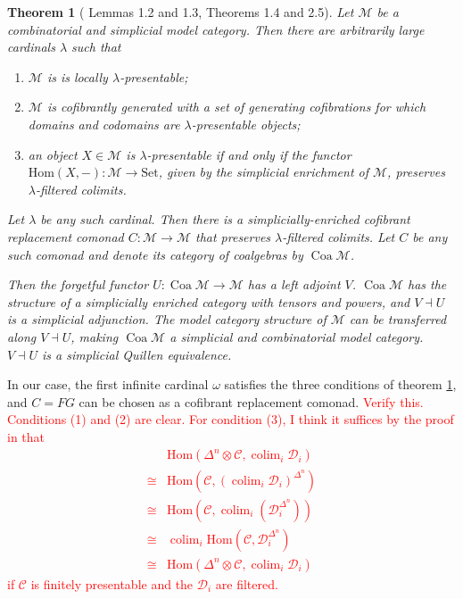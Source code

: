 \documentclass{article}
\newcommand{\todo}[1]{\textcolor{red}{#1}}
\newtheorem{theorem}{Theorem}
\begin{document}
\begin{theorem}[\cite{coalgebraic-models} Lemmas 1.2 and 1.3, Theorems 1.4 and 2.5]
  \label{th:coalgebraic-model-category}
  Let $\mathcal{M}$ be a combinatorial and simplicial model category.
  Then there are arbitrarily large cardinals $\lambda$ such that
  \begin{enumerate}
    \item
      $\mathcal{M}$ is is locally $\lambda$-presentable;
    \item
      $\mathcal{M}$ is cofibrantly generated with a set of generating cofibrations for which domains and codomains are $\lambda$-presentable objects;
    \item
      an object $X \in \mathcal{M}$ is $\lambda$-presentable if and only if the functor $\mathrm{Hom}(X, -) : \mathcal{M} \rightarrow \mathrm{Set}$, given by the simplicial enrichment of $\mathcal{M}$, preserves $\lambda$-filtered colimits.
  \end{enumerate}

  Let $\lambda$ be any such cardinal.
  Then there is a simplicially-enriched cofibrant replacement comonad $C : \mathcal{M} \rightarrow \mathcal{M}$ that preserves $\lambda$-filtered colimits. 
  Let $C$ be any such comonad and denote its category of coalgebras by $\operatorname{Coa} \mathcal{M}$.

  Then the forgetful functor $U : \operatorname{Coa} \mathcal{M} \rightarrow \mathcal{M}$ has a left adjoint $V$.
  $\operatorname{Coa} \mathcal{M}$ has the structure of a simplicially enriched category with tensors and powers, and $V \dashv U$ is a simplicial adjunction.
  The model category structure of $\mathcal{M}$ can be transferred along $V \dashv U$, making $\operatorname{Coa} \mathcal{M}$ a simplicial and combinatorial model category.
  $V \dashv U$ is a simplicial Quillen equivalence.
\end{theorem}

In our case, the first infinite cardinal $\omega$ satisfies the three conditions of theorem \ref{th:coalgebraic-model-category}, and $C = FG$ can be chosen as a cofibrant replacement comonad.
\todo{
  Verify this.
  Conditions (1) and (2) are clear.
  For condition (3), I think it suffices by the proof in \cite{coalgebraic-models} that
  \begin{align}
    & \mathrm{Hom}(\Delta^n \otimes \mathcal{C}, \operatorname{colim}_i \mathcal{D}_i) \\
    \cong {} & \mathrm{Hom}(\mathcal{C}, (\operatorname{colim}_i \mathcal{D}_i)^{\Delta^n}) \\
    \cong {} & \mathrm{Hom}(\mathcal{C}, \operatorname{colim}_i (\mathcal{D}_i^{\Delta^n})) \\
    \cong {} & \operatorname{colim}_i \mathrm{Hom}(\mathcal{C}, \mathcal{D}_i^{\Delta^n}) \\
    \cong {} & \mathrm{Hom}(\Delta^n \otimes \mathcal{C}, \operatorname{colim}_i \mathcal{D}_i) 
  \end{align}
  if $\mathcal{C}$ is finitely presentable and the $\mathcal{D}_i$ are filtered.
}
\end{document}
